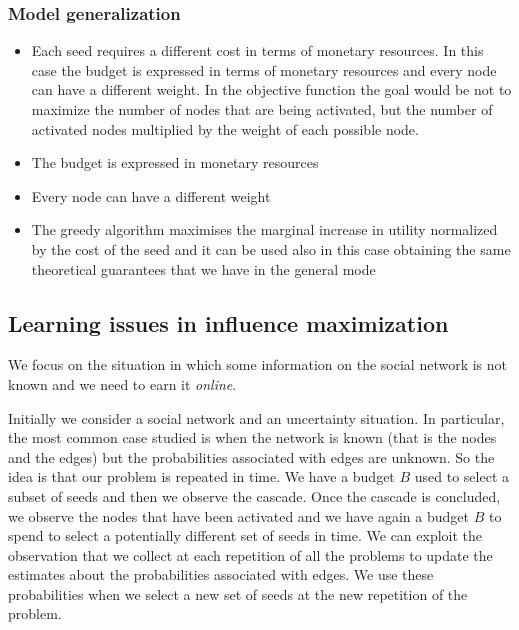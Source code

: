 \documentclass[10pt,a4paper]{article}
\begin{document}
\subsubsection{Model generalization}\label{model-generalization}

\begin{itemize}

\item Each seed requires a different cost in terms of monetary resources. In this case the budget is expressed in terms of monetary resources and every node can have a different weight. In the objective function the goal would be not to maximize the number of nodes that are being activated, but the number of activated nodes multiplied by the weight of each possible node.
\item The budget is expressed in monetary resources
\item Every node can have a different weight
\item The greedy algorithm maximises the marginal increase in utility normalized by the cost of the seed and it can be used also in this case obtaining the same theoretical guarantees that we have in the general mode
\end{itemize}

\subsection{Learning issues in influence maximization}\label{learning-issues-in-influence-maximization}

We focus on the situation in which some information on the social network is not known and we need to earn it \textit{online}.

Initially we consider a social network and an uncertainty situation. In particular, the most common case studied is when the network is known (that is the nodes and the edges) but the probabilities associated with edges are unknown. So the idea is that our problem is repeated in time. We have a budget $B$ used to select a subset of seeds and then we observe the cascade. Once the cascade is concluded, we observe the nodes that have been activated and we have again a budget $B$ to spend to select a potentially different set of seeds in time. We can exploit the observation that we collect at each repetition of all the problems to update the estimates about the probabilities associated with edges. We use these probabilities when we select a new set of seeds at the new repetition of the problem.
\newline
\end{document}

